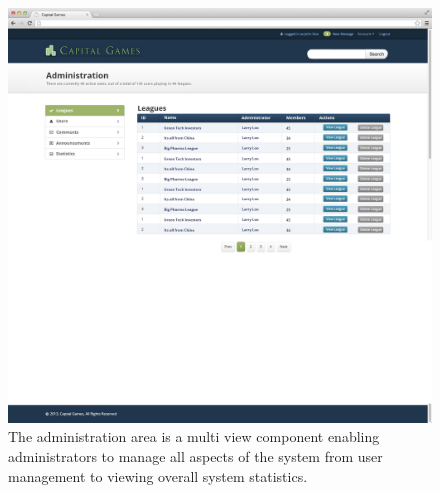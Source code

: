 \begin{figure}
\includegraphics[width=500px]{./mockups/JPEG/adminleagues.jpg}
\caption{The administration area is a multi view component enabling administrators to manage all aspects of the system from user management to viewing overall system statistics.}
\end{figure}


